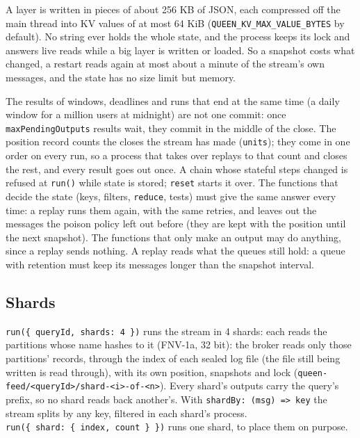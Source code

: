 A layer is written in pieces of about 256 KB of JSON, each compressed off the main thread into KV values of at most 64 KiB (\texttt{QUEEN\_KV\_MAX\_VALUE\_BYTES} by default). No string ever holds the whole state, and the process keeps its lock and answers live reads while a big layer is written or loaded. So a snapshot costs what changed, a restart reads again at most about a minute of the stream's own messages, and the state has no size limit but memory.

The results of windows, deadlines and runs that end at the same time (a daily window for a million users at midnight) are not one commit: once \texttt{maxPendingOutputs} results wait, they commit in the middle of the close. The position record counts the closes the stream has made (\texttt{units}); they come in one order on every run, so a process that takes over replays to that count and closes the rest, and every result goes out once. A chain whose stateful steps changed is refused at \texttt{run()} while state is stored; \texttt{reset} starts it over. The functions that decide the state (keys, filters, \texttt{reduce}, tests) must give the same answer every time: a replay runs them again, with the same retries, and leaves out the messages the poison policy left out before (they are kept with the position until the next snapshot). The functions that only make an output may do anything, since a replay sends nothing. A replay reads what the queues still hold: a queue with retention must keep its messages longer than the snapshot interval.


\subsection{Shards}

\texttt{run(\{\ queryId,\ shards:\ 4\ \})} runs the stream in 4 shards: each reads the partitions whose name hashes to it (FNV-1a, 32 bit): the broker reads only those partitions' records, through the index of each sealed log file (the file still being written is read through), with its own position, snapshots and lock (\texttt{queen-feed/\textless{}queryId\textgreater{}/shard-\textless{}i\textgreater{}-of-\textless{}n\textgreater{}}). Every shard's outputs carry the query's prefix, so no shard reads back another's. With \texttt{shardBy:\ (msg)\ =\textgreater{}\ key} the stream splits by any key, filtered in each shard's process. \texttt{run(\{\ shard:\ \{\ index,\ count\ \}\ \})} runs one shard, to place them on purpose.

